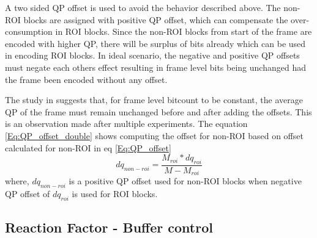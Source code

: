 \documentclass[11pt]{article} %
\begin{document}
A two sided QP offset is used to avoid the behavior described above. The non-ROI blocks are assigned with positive QP offset, which can compensate the over-consumption in ROI blocks. Since the non-ROI blocks from start of the frame are encoded with higher QP, there will be surplus of bits already which can be used in encoding ROI blocks. In ideal scenario, the negative and positive QP offsets must negate each others effect resulting in frame level bits being unchanged had the frame been encoded without any offset.

The study in \cite{ROI-Coding-paper} suggests that, for frame level bitcount to be constant, the average QP of the frame must remain unchanged before and after adding the offsets. This is an observation made after multiple experiments. The equation \ref{Eq:QP_offset_double} shows computing the offset for non-ROI based on offset calculated for non-ROI in eq \ref{Eq:QP_offset}
\begin{equation}
	\label{Eq:QP_offset_double}
		dq_{non-roi} = \frac{M_{roi} * dq_{roi}}{M - M_{roi}}
\end{equation}
where, $dq_{non-roi}$ is a positive QP offset used for non-ROI blocks when negative QP offset of $dq_{roi}$ is used for ROI blocks. 
\subsection{Reaction Factor - Buffer control} 
\end{document}
